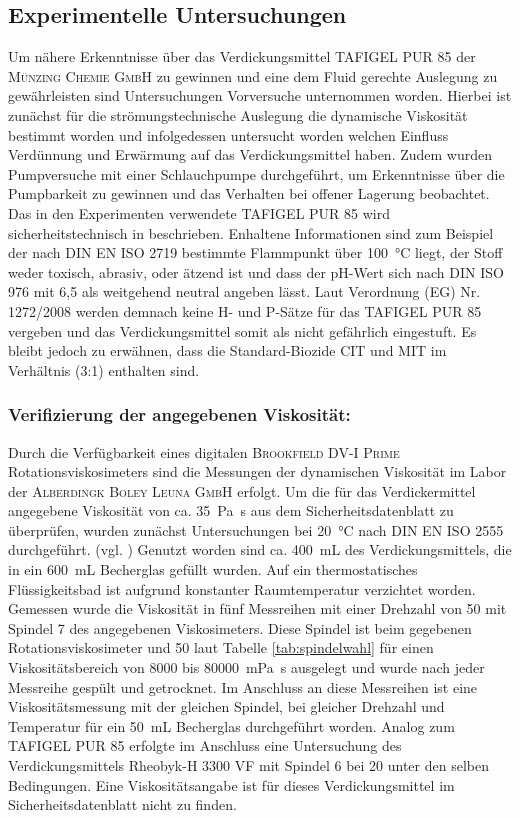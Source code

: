 \subsection{Experimentelle Untersuchungen}
Um nähere Erkenntnisse über das Verdickungsmittel TAFIGEL PUR 85 der \textsc{Münzing Chemie GmbH} zu gewinnen und eine dem Fluid gerechte Auslegung zu gewährleisten sind Untersuchungen Vorversuche unternommen worden. Hierbei ist zunächst für die strömungstechnische Auslegung die dynamische Viskosität bestimmt worden und infolgedessen untersucht worden welchen Einfluss Verdünnung und Erwärmung auf das Verdickungsmittel haben. Zudem wurden Pumpversuche mit einer Schlauchpumpe durchgeführt, um Erkenntnisse über die Pumpbarkeit zu gewinnen und das Verhalten bei offener Lagerung beobachtet.\linebreak
Das in den Experimenten verwendete TAFIGEL PUR 85 wird sicherheitstechnisch in \cite{MunzingChemieGmbH.2020} beschrieben. Enhaltene Informationen sind zum Beispiel der nach DIN EN ISO 2719 bestimmte Flammpunkt über \SI{100}{\celsius} liegt, der Stoff weder toxisch, abrasiv, oder ätzend ist und dass der pH-Wert sich nach DIN ISO 976 mit 6,5 als weitgehend neutral angeben lässt. Laut Verordnung (EG) Nr. 1272/2008 werden demnach keine H- und P-Sätze für das TAFIGEL PUR 85 vergeben und das Verdickungsmittel somit als nicht gefährlich eingestuft. Es bleibt jedoch zu erwähnen, dass die Standard-Biozide CIT und MIT im Verhältnis (3:1) enthalten sind.

\subsubsection{Verifizierung der angegebenen Viskosität:}
Durch die Verfügbarkeit eines digitalen \textsc{Brookfield DV-I Prime} Rotationsviskosimeters sind die Messungen der dynamischen Viskosität im Labor der \textsc{Alberdingk Boley Leuna GmbH} erfolgt. Um die für das Verdickermittel angegebene Viskosität von ca. \SI{35}{\pascal \second} aus dem Sicherheitsdatenblatt zu überprüfen, wurden zunächst Untersuchungen bei \SI{20}{\celsius} nach DIN EN ISO 2555 durchgeführt. (vgl. \cite{MunzingChemieGmbH.2020}) Genutzt worden sind ca. \SI{400}{\milli \liter} des Verdickungsmittels, die in ein \SI{600}{\milli \liter} Becherglas gefüllt wurden. Auf ein thermostatisches Flüssigkeitsbad ist aufgrund konstanter Raumtemperatur verzichtet worden. Gemessen wurde die Viskosität in fünf Messreihen mit einer Drehzahl von \SI{50}{\rpm} mit Spindel 7 des angegebenen Viskosimeters. Diese Spindel ist beim gegebenen Rotationsviskosimeter und \SI{50}{\rpm} laut Tabelle \ref{tab:spindelwahl} für einen Viskositätsbereich von 8000 bis \SI{80000}{\milli \pascal \second} ausgelegt und wurde nach jeder Messreihe gespült und getrocknet. Im Anschluss an diese Messreihen ist eine Viskositätsmessung mit der gleichen Spindel, bei gleicher Drehzahl und Temperatur für ein \SI{50}{\milli \liter} Becherglas durchgeführt worden. Analog zum TAFIGEL PUR 85 erfolgte im Anschluss eine Untersuchung des Verdickungsmittels Rheobyk-H 3300 VF mit Spindel 6 bei \SI{20}{\rpm} unter den selben Bedingungen. Eine Viskositätsangabe ist für dieses Verdickungsmittel im Sicherheitsdatenblatt nicht zu finden. \cite{byk.2020}


